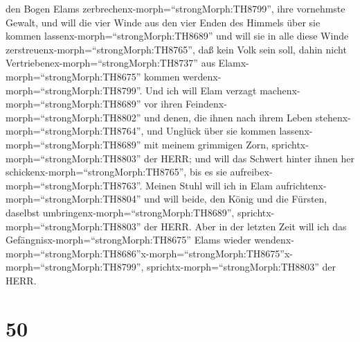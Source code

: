 den Bogen Elams zerbrechenx-morph=``strongMorph:TH8799'', ihre
vornehmste Gewalt,  und will die vier Winde aus den vier
Enden des Himmels über sie kommen lassenx-morph=``strongMorph:TH8689''
und will sie in alle diese Winde
zerstreuenx-morph=``strongMorph:TH8765'', daß kein Volk sein soll, dahin
nicht Vertriebenex-morph=``strongMorph:TH8737'' aus
Elamx-morph=``strongMorph:TH8675'' kommen
werdenx-morph=``strongMorph:TH8799''.  Und ich will Elam
verzagt machenx-morph=``strongMorph:TH8689'' vor ihren
Feindenx-morph=``strongMorph:TH8802'' und denen, die ihnen nach ihrem
Leben stehenx-morph=``strongMorph:TH8764'', und Unglück über sie kommen
lassenx-morph=``strongMorph:TH8689'' mit meinem grimmigen Zorn,
sprichtx-morph=``strongMorph:TH8803'' der HERR; und will das Schwert
hinter ihnen her schickenx-morph=``strongMorph:TH8765'', bis es sie
aufreibex-morph=``strongMorph:TH8763''.  Meinen Stuhl will
ich in Elam aufrichtenx-morph=``strongMorph:TH8804'' und will beide, den
König und die Fürsten, daselbst umbringenx-morph=``strongMorph:TH8689'',
sprichtx-morph=``strongMorph:TH8803'' der HERR.  Aber in
der letzten Zeit will ich das Gefängnisx-morph=``strongMorph:TH8675''
Elams wieder
wendenx-morph=``strongMorph:TH8686''\textbar x-morph=``strongMorph:TH8675''x-morph=``strongMorph:TH8799'',
sprichtx-morph=``strongMorph:TH8803'' der HERR.

\hypertarget{section-49}{%
\section{50}\label{section-49}}

